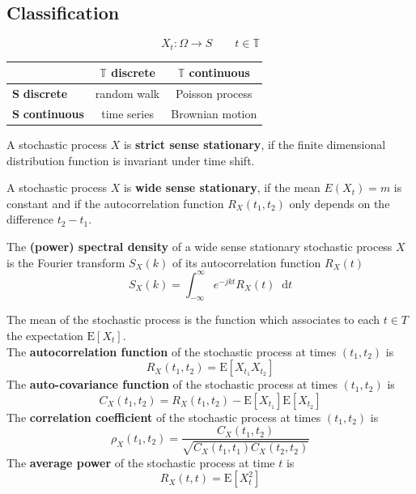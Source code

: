 \documentclass[11pt]{article}
\theoremstyle{definition}
\newcommand*\ev[1]{\mathrel{\text{E}\left[#1\right]}}
\newcommand*\diff{\mathop{}\!\mathrm{d}}
\begin{document}
\pagebreak
\subsection{Classification}
\begin{equation*}
	X_t : \Omega \rightarrow S\qquad t\in\mathbb{T}
\end{equation*}
\begin{tabularx}{\linewidth}{|X||c|c|}
	\hline
	& $\bm{\mathbb{T}}$ \textbf{discrete} & $\bm{\mathbb{T}}$ \textbf{continuous}\\
	\hline
	\hline
	$\bm{S}$ \textbf{discrete} & random walk & Poisson process\\
	\hline
	$\bm{S}$ \textbf{continuous} & time series & Brownian motion\\
	\hline
\end{tabularx}

\begin{definition}
	A stochastic process $X$ is \textbf{strict sense stationary}, if the finite dimensional distribution function is invariant under time shift.
\end{definition}

\begin{definition}
	A stochastic process $X$ is \textbf{wide sense stationary}, if the mean $E(X_t) = m$ is constant and if the autocorrelation function $R_X(t_1,t_2)$ only depends on the difference $t_2-t_1$.
\end{definition}

\begin{definition}
	The \textbf{(power) spectral density} of a wide sense stationary stochastic process $X$ is the Fourier transform $S_X(k)$ of its autocorrelation function $R_X(t)$
	\begin{equation*}
		S_X(k) = \int_{-\infty}^{\infty}e^{-jkt} R_X(t)\diff{t}
	\end{equation*}
\end{definition}

\begin{definition}
	 The mean of the stochastic process is the function which associates to each $t \in T$ the expectation $\ev{X_t}$.\\
	 The \textbf{autocorrelation function} of the stochastic process at times $(t_1,t_2)$ is
	 \begin{equation*}
	 	R_X(t_1,t_2) = \ev{X_{t_1}X_{t_2}}
	 \end{equation*}
	 The \textbf{auto-covariance function} of the stochastic process at times $(t_1,t_2)$ is
	 \begin{equation*}
	 	C_X(t_1,t_2) = R_X(t_1,t_2) - \ev{X_{t_1}}\ev{X_{t_2}}
	 \end{equation*}
	 The \textbf{correlation coefficient} of the stochastic process at times $(t_1,t_2)$ is
	 \begin{equation*}
		\rho_X(t_1,t_2) = \frac{C_X(t_1,t_2)}{\sqrt{C_X(t_1,t_1) C_X(t_2,t_2)}}
	 \end{equation*}
	 The \textbf{average power} of the stochastic process at time $t$ is
	 \begin{equation*}
	 	R_X(t,t) = \ev{X_t^2}
	 \end{equation*}
\end{definition}
\end{document}
